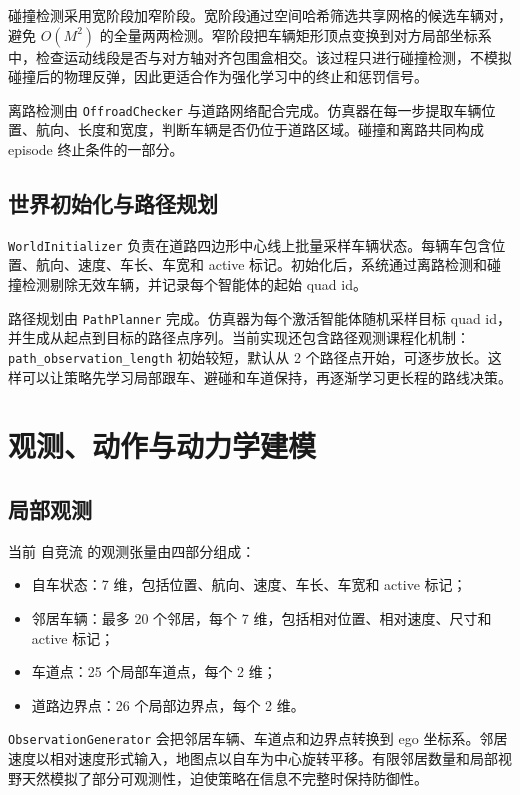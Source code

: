 \documentclass[preprint,12pt]{elsarticle}
\newcommand{\Zijingliu}{自竞流}
\begin{document}
碰撞检测采用宽阶段加窄阶段。宽阶段通过空间哈希筛选共享网格的候选车辆对，避免 $O(M^2)$ 的全量两两检测。窄阶段把车辆矩形顶点变换到对方局部坐标系中，检查运动线段是否与对方轴对齐包围盒相交。该过程只进行碰撞检测，不模拟碰撞后的物理反弹，因此更适合作为强化学习中的终止和惩罚信号。

离路检测由 \texttt{OffroadChecker} 与道路网络配合完成。仿真器在每一步提取车辆位置、航向、长度和宽度，判断车辆是否仍位于道路区域。碰撞和离路共同构成 episode 终止条件的一部分。

\subsection{世界初始化与路径规划}

\texttt{WorldInitializer} 负责在道路四边形中心线上批量采样车辆状态。每辆车包含位置、航向、速度、车长、车宽和 active 标记。初始化后，系统通过离路检测和碰撞检测剔除无效车辆，并记录每个智能体的起始 quad id。

路径规划由 \texttt{PathPlanner} 完成。仿真器为每个激活智能体随机采样目标 quad id，并生成从起点到目标的路径点序列。当前实现还包含路径观测课程化机制：\texttt{path\_observation\_length} 初始较短，默认从 2 个路径点开始，可逐步放长。这样可以让策略先学习局部跟车、避碰和车道保持，再逐渐学习更长程的路线决策。

\section{观测、动作与动力学建模}

\subsection{局部观测}

当前 \Zijingliu{} 的观测张量由四部分组成：
\begin{itemize}
  \item 自车状态：7 维，包括位置、航向、速度、车长、车宽和 active 标记；
  \item 邻居车辆：最多 20 个邻居，每个 7 维，包括相对位置、相对速度、尺寸和 active 标记；
  \item 车道点：25 个局部车道点，每个 2 维；
  \item 道路边界点：26 个局部边界点，每个 2 维。
\end{itemize}

\texttt{ObservationGenerator} 会把邻居车辆、车道点和边界点转换到 ego 坐标系。邻居速度以相对速度形式输入，地图点以自车为中心旋转平移。有限邻居数量和局部视野天然模拟了部分可观测性，迫使策略在信息不完整时保持防御性。
\end{document}
